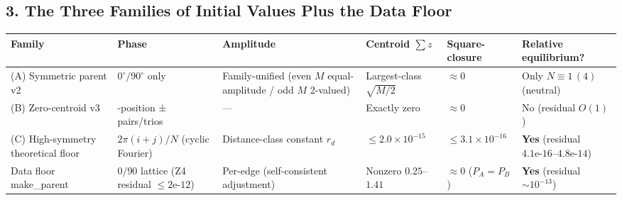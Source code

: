 \documentclass[
  a4paper,
]{ltjsarticle}
\newcounter{none} %
\begin{document}
\subsection{3. The Three Families of Initial Values Plus the Data
Floor}\label{the-three-families-of-initial-values-plus-the-data-floor}

{\def\LTcaptype{none} %
\begin{longtable}[]{@{}
  >{\raggedright\arraybackslash}p{}
  >{\raggedright\arraybackslash}p{}
  >{\raggedright\arraybackslash}p{}
  >{\raggedright\arraybackslash}p{}
  >{\raggedright\arraybackslash}p{}
  >{\raggedright\arraybackslash}p{}@{}}
\toprule\noalign{}
\begin{minipage}[b]{\linewidth}\raggedright
Family
\end{minipage} & \begin{minipage}[b]{\linewidth}\raggedright
Phase
\end{minipage} & \begin{minipage}[b]{\linewidth}\raggedright
Amplitude
\end{minipage} & \begin{minipage}[b]{\linewidth}\raggedright
Centroid \(\sum z\)
\end{minipage} & \begin{minipage}[b]{\linewidth}\raggedright
Square-closure
\end{minipage} & \begin{minipage}[b]{\linewidth}\raggedright
Relative equilibrium?
\end{minipage} \\
\midrule\noalign{}
\endhead
\bottomrule\noalign{}
\endlastfoot
(A) Symmetric parent v2 & \(0^\circ/90^\circ\) only & Family-unified
(even \(M\) equal-amplitude / odd \(M\) 2-valued) & Largest-class
\(\sqrt{M/2}\) & \(\approx0\) & Only \(N\equiv1\,(4)\) (neutral) \\
(B) Zero-centroid v3 & 4-position ± pairs/trios & --- & Exactly zero &
\(\approx0\) & No (residual \(O(1)\)) \\
(C) High-symmetry theoretical floor & \(2\pi(i+j)/N\) (cyclic Fourier) &
Distance-class constant \(r_d\) & \(\le2.0\times10^{-15}\) &
\(\le3.1\times10^{-16}\) & \textbf{Yes} (residual
\(4.1\text{e-}16\)--\(4.8\text{e-}14\)) \\
Data floor make\_parent & \(0/90\) lattice (Z4 residual
\(\le2\text{e-}12\)) & Per-edge (self-consistent adjustment) & Nonzero
\(0.25\)--\(1.41\) & \(\approx0\) (\(P_A=P_B\)) & \textbf{Yes} (residual
\(\sim10^{-13}\)) \\
\end{longtable}
}
\end{document}
